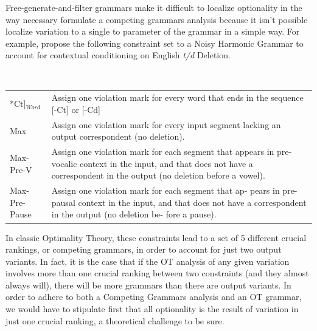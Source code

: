 Free-generate-and-filter grammars make it difficult to localize optionality in the way necessary formulate a competing grammars analysis because it isn't possible localize variation to a single to parameter of the grammar in a simple way.
For example, \citet{Coetzee2012} propose the following constraint set to a Noisy Harmonic Grammar to account for contextual conditioning on English {\it t/d} Deletion.
\begin{exe}
	\ex \label{noisy.hg}\  \\
\begin{tabular}{lp{3in}}
	*{\sc Ct}]$_{Word}$& Assign one violation mark for every word that ends in the sequence [-Ct] or [-Cd]\\
	{\sc Max} & Assign one violation mark for every input segment lacking an output correspondent (no deletion).\\
	{\sc Max-Pre-V} & Assign one violation mark for each segment that appears in pre-vocalic context in the input, and that does not have a correspondent in the output (no deletion before a vowel).\\
	{\sc Max-Pre-Pause} &Assign one violation mark for each segment that ap- pears in pre-pausal context in the input, and that does not have a correspondent in the output (no deletion be- fore a pause).
\end{tabular}
\end{exe}
In classic Optimality Theory, these constraints lead to a set of 5 different crucial rankings, or competing grammars, in order to account for just two output variants.
In fact, it is the case that if the OT analysis of any given variation involves more than one crucial ranking between two constraints (and they almost always will), there will be more grammars than there are output variants.
In order to adhere to both a Competing Grammars analysis and an OT grammar, we would have to stipulate first that all optionality is the result of variation in just one crucial ranking, a theoretical challenge to be sure.

